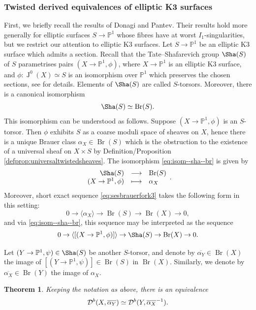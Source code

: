 \documentclass[11pt,twoside]{amsart}
\numberwithin{equation}{section}
\newtheorem{theorem}[dummy]{Theorem}
\theoremstyle{definition}
\theoremstyle{plain}
\newcommand{\PP}{\ensuremath{\mathbb{P}}}
\def\Db{\calD^{b}}
\def\Br{\operatorname{Br}}
\def\Jac{\operatorname{J}}
\def\ol{\overline}
\begin{document}
\subsubsection{Twisted derived equivalences of elliptic K3 surfaces}
First, we briefly recall the results of Donagi and Pantev. Their results hold more generally for elliptic surfaces $S\to \PP^1$ whose fibres have at worst $I_1$-singularities, but we restrict our attention to elliptic K3 surfaces. Let $S\to \PP^1$ be an elliptic K3 surface which admits a section. Recall that the Tate--Shafarevich group $\Sha(S)$ of $S$ parametrises pairs $(X\to \PP^1,\phi)$, where $X\to \PP^1$ is an elliptic K3 surface, and $\phi: \Jac^0(X)\simeq S$ is an isomorphism over $\PP^1$ which preserves the chosen sections, see \cite[\S11.5]{Huy16} for details. Elements of $\Sha(S)$ are called $S$-torsors. Moreover, there is a canonical isomorphism 
\begin{equation}\label{eq:isom--sha--br}
    \Sha(S)\simeq \Br(S).
\end{equation}
This isomorphism can be understood as follows. Suppose $(X\to \PP^1,\phi)$ is an $S$-torsor. Then $\phi$ exhibits $S$ as a coarse moduli space of sheaves on $X$, hence there is a unique Brauer class $\alpha_X\in \Br(S)$ which is the obstruction to the existence of a universal sheaf on $X\times S$ by Definition/Proposition \ref{defprop:universaltwistedsheaves}. The isomorphism  \eqref{eq:isom--sha--br} is given by 
\begin{equation*}
    \functionstar{\Sha(S)}{\Br(S)}{(X\to \PP^1,\phi)}{\alpha_X}.
\end{equation*}
Moreover, short exact sequence \eqref{eq:sesbrauerfork3} takes the following form in this setting:
\begin{equation*}
    0\to \langle \alpha_X\rangle \to \Br(S)\to \Br(X)\to 0,
\end{equation*}
and via \eqref{eq:isom--sha--br}, this sequence may be interpreted as the sequence 
\begin{equation}\label{eq:ses--shas--brx}
    0 \to \langle[(X\to\PP^1,\phi)]\rangle \to \Sha(S)\to \Br(X)\to 0.
\end{equation}

Let $(Y\to \PP^1,\psi)\in \Sha(S)$ be another $S$-torsor, and denote by $\ol{\alpha_Y}\in \Br(X)$ the image of $[(Y\to\PP^1,\psi)]\in \Br(S)$ in $\Br(X).$ Similarly, we denote by $\ol{\alpha_X}\in \Br(Y)$ the image of $\alpha_X$. 

\begin{theorem}\cite{DP08}\label{thm:donagi--pantev}
    Keeping the notation as above, there is an equivalence $$\Db(X,\ol{\alpha_Y})\simeq \Db(Y,\ol{\alpha_X}^{-1}).$$
\end{theorem}
\end{document}
